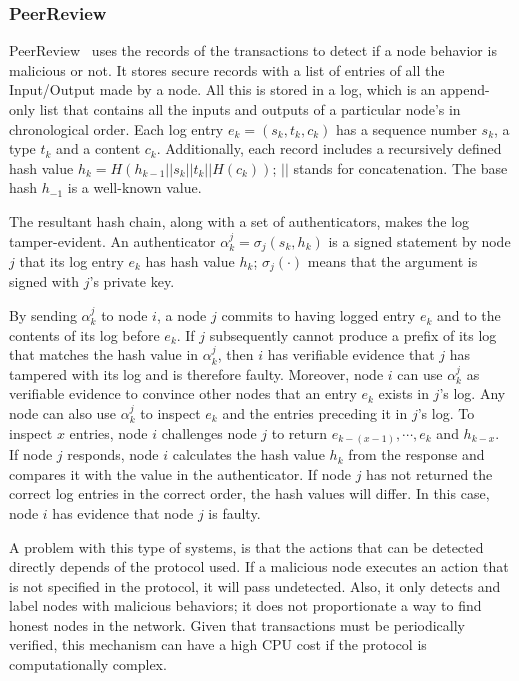 \subsubsection{PeerReview}
\label{sec:peerreview}
PeerReview~\cite{haeberlen2007peerreview} uses the records of the transactions
to detect if a node behavior is malicious or not. It stores secure records with
a list of entries of all the Input/Output made by a node. All this is stored in
a log, which is an append-only list that contains all the inputs and outputs of a
particular node's in chronological order. Each log entry $e_k = (s_k, t_k,
c_k)$ has a sequence number $s_k$, a type $t_k$ and a content $c_k$.
Additionally, each record includes a recursively defined hash value $h_k =
H(h_{k-1} || s_k|| t_k || H(c_k))$; $||$ stands for concatenation. The base
hash $h_{-1}$ is a well-known value.


The resultant hash chain, along with a set of authenticators, makes the log tamper-evident. An authenticator
$\alpha^j_k= \sigma_j(s_k , h_k )$ is a signed statement by node $j$ that its log
entry $e_k$ has hash value $h_k$; $\sigma_j (\cdot)$ means that the argument is
signed with $j$'s private key.

By sending $\alpha^j_k$ to node $i$, a node $j$ commits to having
 logged entry $e_k$ and to the contents of its log before $e_k$. If $j$
 subsequently cannot produce a prefix of its log that matches
 the hash value in $\alpha^j_k$, then $i$ has verifiable evidence that $j$
has tampered with its log and is therefore faulty.
Moreover, node $i$ can use $\alpha^j_k$ as verifiable evidence to convince
 other nodes that an entry $e_k$ exists in $j$'s log. Any node
 can also use $\alpha^j_k$ to inspect $e_k$ and the entries preceding it
 in $j$'s log. To inspect $x$ entries, node $i$ challenges node $j$ to return
 $e_{k - (x-1)}, \cdots , e_k$ and $h_{k - x}$. If node $j$ responds, node $i$ calculates the
hash value $h_k$ from the response and compares it with the
 value in the authenticator. If node $j$ has not returned the correct
 log entries in the correct order, the hash values will differ. In
this case, node $i$ has evidence that node $j$ is faulty. 
 

A problem with this type of systems, is that the actions that can be detected
directly depends of the protocol used. If a malicious node executes an action
that is not specified in the protocol, it will pass undetected. Also, it only
detects and label nodes with malicious behaviors; it does not proportionate a
way to find honest nodes in the network.
Given that transactions must be periodically verified, this mechanism can have a high
CPU cost if the protocol is computationally complex.
 

